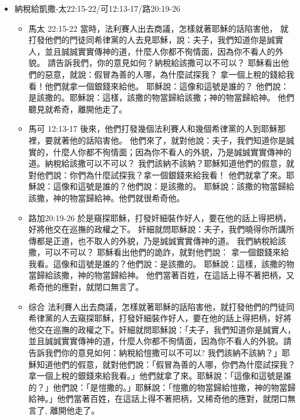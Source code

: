 \begin{itemize}
\item{納稅給凱撒-太22:15-22/可12:13-17/路20:19-26}
\begin{itemize}
\item{馬太 22:15-22}
當時，法利賽人出去商議，怎樣就著耶穌的話陷害他，
就打發他們的門徒同希律黨的人去見耶穌，說：夫子，我們知道你是誠實人，並且誠誠實實傳神的道，什麼人你都不徇情面，因為你不看人的外貌。
請告訴我們，你的意見如何？納稅給該撒可以不可以？
耶穌看出他們的惡意，就說：假冒為善的人哪，為什麼試探我？
拿一個上稅的錢給我看！他們就拿一個銀錢來給他。
耶穌說：這像和這號是誰的？
他們說：是該撒的。耶穌說：這樣，該撒的物當歸給該撒；神的物當歸給神。
他們聽見就希奇，離開他走了。
\item{馬可 12:13-17}
後來，他們打發幾個法利賽人和幾個希律黨的人到耶穌那裡，要就著他的話陷害他。
他們來了，就對他說：夫子，我們知道你是誠實的，什麼人你都不徇情面；因為你不看人的外貌，乃是誠誠實實傳神的道。納稅給該撒可以不可以？
我們該納不該納？耶穌知道他們的假意，就對他們說：你們為什麼試探我？拿一個銀錢來給我看！
他們就拿了來。耶穌說：這像和這號是誰的？他們說：是該撒的。
耶穌說：該撒的物當歸給該撒，神的物當歸給神。他們就很希奇他。
\item{路加20:19-26}
於是窺探耶穌，打發奸細裝作好人，要在他的話上得把柄，好將他交在巡撫的政權之下。
奸細就問耶穌說：夫子，我們曉得你所講所傳都是正道，也不取人的外貌，乃是誠誠實實傳神的道。
我們納稅給該撒，可以不可以？
耶穌看出他們的詭詐，就對他們說：
拿一個銀錢來給我看。這像和這號是誰的？他們說：是該撒的。
耶穌說：這樣，該撒的物當歸給該撒，神的物當歸給神。
他們當著百姓，在這話上得不著把柄，又希奇他的應對，就閉口無言了。
\item{综合}
法利賽人出去商議，怎樣就著耶穌的話陷害他，就打發他們的門徒同希律黨的人去窺探耶穌，打發奸細裝作好人，要在他的話上得把柄，好將他交在巡撫的政權之下。奸細就問耶穌說：「夫子，我們知道你是誠實人，並且誠誠實實傳神的道，什麼人你都不徇情面，因為你不看人的外貌。請告訴我們你的意見如何：納稅給愷撒可以不可以? 我們該納不該納？」耶穌知道他們的假意，就對他們說：「假冒為善的人哪，你們為什麼試探我？拿一個上稅的銀錢來給我看。」他們就拿了來。耶穌說：「這像和這號是誰的？」他們說：「是愷撒的。」耶穌說：「愷撒的物當歸給愷撒，神的物當歸給神。」他們當著百姓，在這話上得不著把柄，又稀奇他的應對，就閉口無言了, 離開他走了。
\end{itemize}


\end{itemize}
